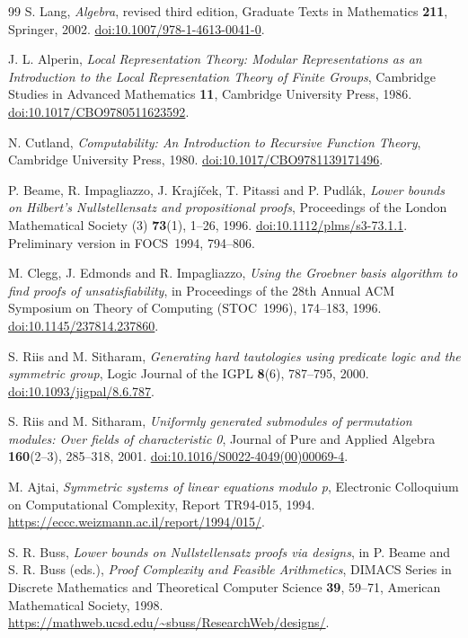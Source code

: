 \documentclass[11pt,a4paper,oneside,openany]{book}
\theoremstyle{definition}\newtheorem{definition}[theorem]{Definition}
\theoremstyle{remark}\newtheorem{remark}[theorem]{Remark}
\numberwithin{equation}{chapter}
\begin{document}
\begin{thebibliography}{99}
S. Lang, \emph{Algebra}, revised third edition,
Graduate Texts in Mathematics \textbf{211}, Springer, 2002.
\href{https://doi.org/10.1007/978-1-4613-0041-0}{doi:10.1007/978-1-4613-0041-0}.

J. L. Alperin, \emph{Local Representation Theory:
Modular Representations as an Introduction to the Local
Representation Theory of Finite Groups},
Cambridge Studies in Advanced Mathematics \textbf{11},
Cambridge University Press, 1986.
\href{https://doi.org/10.1017/CBO9780511623592}{doi:10.1017/CBO9780511623592}.

N. Cutland, \emph{Computability: An Introduction to Recursive
Function Theory}, Cambridge University Press, 1980.
\href{https://doi.org/10.1017/CBO9781139171496}{doi:10.1017/CBO9781139171496}.


P. Beame, R. Impagliazzo, J. Kraj\'i\v cek, T. Pitassi and P. Pudl\'ak,
\emph{Lower bounds on Hilbert's Nullstellensatz and propositional proofs},
Proceedings of the London Mathematical Society (3)
\textbf{73}(1), 1--26, 1996.
\href{https://doi.org/10.1112/plms/s3-73.1.1}{doi:10.1112/plms/s3-73.1.1}.
Preliminary version in FOCS~1994, 794--806.

M. Clegg, J. Edmonds and R. Impagliazzo,
\emph{Using the Groebner basis algorithm to find proofs of unsatisfiability},
in Proceedings of the 28th Annual ACM Symposium on Theory of Computing
(STOC~1996), 174--183, 1996.
\href{https://doi.org/10.1145/237814.237860}{doi:10.1145/237814.237860}.

S. Riis and M. Sitharam,
\emph{Generating hard tautologies using predicate logic and the symmetric group},
Logic Journal of the IGPL \textbf{8}(6), 787--795, 2000.
\href{https://doi.org/10.1093/jigpal/8.6.787}{doi:10.1093/jigpal/8.6.787}.

S. Riis and M. Sitharam,
\emph{Uniformly generated submodules of permutation modules:
Over fields of characteristic 0},
Journal of Pure and Applied Algebra \textbf{160}(2--3), 285--318, 2001.
\href{https://doi.org/10.1016/S0022-4049(00)00069-4}{doi:10.1016/S0022-4049(00)00069-4}.

M. Ajtai, \emph{Symmetric systems of linear equations modulo p},
Electronic Colloquium on Computational Complexity, Report TR94-015, 1994.
\url{https://eccc.weizmann.ac.il/report/1994/015/}.

S. R. Buss, \emph{Lower bounds on Nullstellensatz proofs via designs},
in P. Beame and S. R. Buss (eds.), \emph{Proof Complexity and Feasible
Arithmetics}, DIMACS Series in Discrete Mathematics and Theoretical
Computer Science \textbf{39}, 59--71, American Mathematical Society, 1998.
\url{https://mathweb.ucsd.edu/~sbuss/ResearchWeb/designs/}.


\end{thebibliography}
\end{document}
